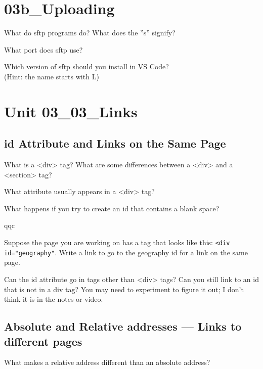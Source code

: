 \documentclass[letterpaper,12pt]{exam}
\begin{document}
\begin{questions}
	\section*{03b\_Uploading}
	
	\question What do sftp programs do? What does the ''s'' signify?
	\vspace{1.5cm}
	
	\question What port does sftp use? \blank

	\question Which version of sftp should you install in VS Code? \blank\\ (Hint: the name starts with L)
	
\section*{Unit 03\_03\_Links}	
\subsection*{id Attribute and Links on the Same Page}
\question What is a <div> tag?  What are some differences between a <div> and a <section> tag?
\vspace{2cm}

\question What attribute usually appears in a <div> tag? \blank

\question What happens if you try to create an id that contains a blank space? 
\vspace{1.5cm}

qqc

\question Suppose the page you are working on has a tag that looks like this: \texttt{<div id="geography"}.  Write a link to go to the geography id for a link on the same page. 
\vspace{1cm}

\question Can the id attribute go in tags other than <div> tags?  Can you still link to an id that is not in a div tag?  You may need to experiment to figure it out; I don't think it is in the notes or video.
\vspace{1.5cm}

\subsection*{Absolute and Relative addresses --- Links to different pages}
\question What makes a relative address different than an absolute address? 
\vspace{1.5cm}


\end{questions}
\end{document}
